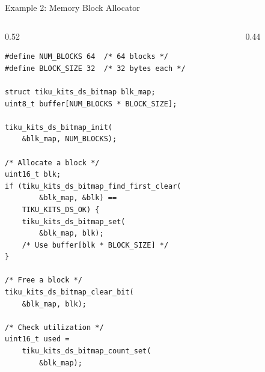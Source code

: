 \documentclass[aspectratio=169, 10pt]{beamer}
\begin{document}
\begin{frame}[fragile]{Example 2: Memory Block Allocator}
\begin{columns}[T]
\begin{column}{0.52\textwidth}
\begin{lstlisting}[style=cstyle,
  title={Simple block allocator with bitmap}]
#define NUM_BLOCKS 64  /* 64 blocks */
#define BLOCK_SIZE 32  /* 32 bytes each */

struct tiku_kits_ds_bitmap blk_map;
uint8_t buffer[NUM_BLOCKS * BLOCK_SIZE];

tiku_kits_ds_bitmap_init(
    &blk_map, NUM_BLOCKS);

/* Allocate a block */
uint16_t blk;
if (tiku_kits_ds_bitmap_find_first_clear(
        &blk_map, &blk) ==
    TIKU_KITS_DS_OK) {
    tiku_kits_ds_bitmap_set(
        &blk_map, blk);
    /* Use buffer[blk * BLOCK_SIZE] */
}

/* Free a block */
tiku_kits_ds_bitmap_clear_bit(
    &blk_map, blk);

/* Check utilization */
uint16_t used =
    tiku_kits_ds_bitmap_count_set(
        &blk_map);
\end{lstlisting}
\end{column}

\begin{column}{0.44\textwidth}
\begin{center}
\end{center}


\end{column}
\end{columns}
\end{frame}
\end{document}
